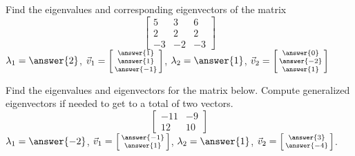 \documentclass{ximera}
\begin{document}
\begin{exercise}%
    Find the eigenvalues and corresponding eigenvectors of the matrix 
    \[ 
    \begin{bmatrix} 
    5 & 3 & 6 \\ 
    2 & 2 & 2 \\ 
    -3 & -2 & -3 
    \end{bmatrix} 
    \]
    $\lambda_1 = \answer{2}$, $\vec{v}_1 = \left[\begin{smallmatrix} \answer{1}\\ \answer{1}\\ \answer{-1} \end{smallmatrix}\right]$, $\lambda_2 = \answer{1}$, $\vec{v}_2 = \left[\begin{smallmatrix} \answer{0}\\ \answer{-2}\\ \answer{1} \end{smallmatrix}\right]$
\end{exercise}

\begin{exercise}%
    Find the eigenvalues and eigenvectors for the matrix below. Compute generalized eigenvectors if needed to get to a total of two vectors. 
    \[ 
    \begin{bmatrix} 
    -11 & -9 \\ 
    12 & 10 
    \end{bmatrix} 
    \]
    $\lambda_1 = \answer{-2}$, $\vec{v}_1 = \left[\begin{smallmatrix} \answer{-1} \\ \answer{1} \end{smallmatrix}\right]$, $\lambda_2 = \answer{1}$, $\vec{v}_2 = \left[\begin{smallmatrix} \answer{3} \\ \answer{-4} \end{smallmatrix}\right]$. 
\end{exercise}
\end{document}
